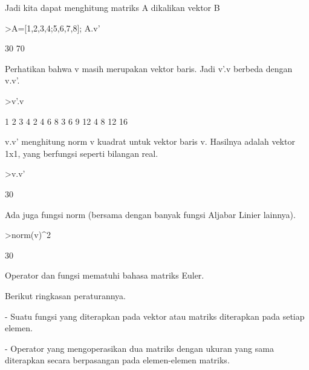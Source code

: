 \documentclass{article}
\begin{document}
\begin{eulernotebook}
\begin{eulercomment}
\begin{eulercomment}
\begin{eulercomment}
\begin{eulercomment}
\begin{eulercomment}
\begin{eulercomment}
\begin{eulercomment}
Jadi kita dapat menghitung matriks A dikalikan vektor B
\end{eulercomment}
\begin{eulerprompt}
>A=[1,2,3,4;5,6,7,8]; A.v'
\end{eulerprompt}
\begin{euleroutput}
             30 
             70 
\end{euleroutput}
\begin{eulercomment}
Perhatikan bahwa v masih merupakan vektor baris. Jadi v'.v berbeda
dengan v.v'.
\end{eulercomment}
\begin{eulerprompt}
>v'.v
\end{eulerprompt}
\begin{euleroutput}
              1             2             3             4 
              2             4             6             8 
              3             6             9            12 
              4             8            12            16 
\end{euleroutput}
\begin{eulercomment}
v.v' menghitung norm v kuadrat untuk vektor baris v. Hasilnya adalah
vektor 1x1, yang berfungsi seperti bilangan real.
\end{eulercomment}
\begin{eulerprompt}
>v.v'
\end{eulerprompt}
\begin{euleroutput}
  30
\end{euleroutput}
\begin{eulercomment}
Ada juga fungsi norm (bersama dengan banyak fungsi Aljabar Linier
lainnya).
\end{eulercomment}
\begin{eulerprompt}
>norm(v)^2
\end{eulerprompt}
\begin{euleroutput}
  30
\end{euleroutput}
\begin{eulercomment}
Operator dan fungsi mematuhi bahasa matriks Euler.

Berikut ringkasan peraturannya.

- Suatu fungsi yang diterapkan pada vektor atau matriks diterapkan
pada setiap elemen.

- Operator yang mengoperasikan dua matriks dengan ukuran yang sama
diterapkan secara berpasangan pada elemen-elemen matriks.


\end{eulercomment}
\end{eulercomment}
\end{eulercomment}
\end{eulercomment}
\end{eulercomment}
\end{eulercomment}
\end{eulercomment}
\end{eulernotebook}
\end{document}

